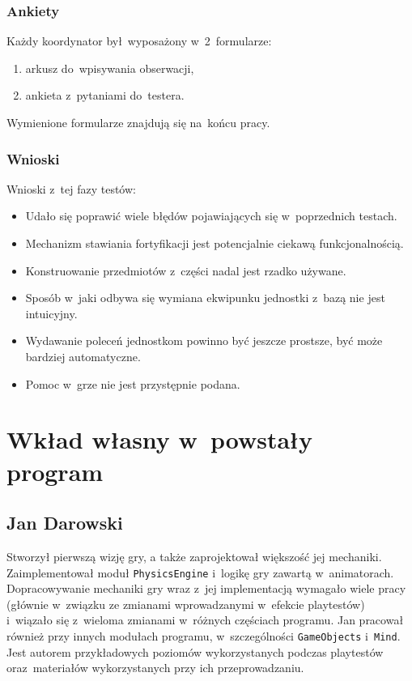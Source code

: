 \documentclass[licencjacka]{pracamgr}
\begin{document}
    \subsection{Ankiety}
      Każdy koordynator był~wyposażony w~2~formularze:
      \begin{enumerate}
	\item arkusz do~wpisywania obserwacji,
	\item ankieta z~pytaniami do~testera.
      \end{enumerate}

      \noindent
      Wymienione formularze znajdują się na~końcu pracy.

    \subsection{Wnioski}
      Wnioski z~tej fazy testów:
      \begin{itemize}
	\item Udało się poprawić wiele błędów pojawiających się w~poprzednich testach.
	\item Mechanizm stawiania fortyfikacji jest potencjalnie ciekawą funkcjonalnością.
	\item Konstruowanie przedmiotów z~części nadal jest rzadko używane.
	\item Sposób w~jaki odbywa się wymiana ekwipunku jednostki z~bazą nie jest intuicyjny.
	\item Wydawanie poleceń jednostkom powinno być jeszcze prostsze, być może bardziej automatyczne.
	\item Pomoc w~grze nie jest przystępnie podana.
      \end{itemize}


\chapter{Wkład własny w~powstały program}

  \section{Jan Darowski}
    Stworzył pierwszą wizję gry, a także zaprojektował większość jej mechaniki. Zaimplementował moduł \texttt{PhysicsEngine}
    i~logikę gry zawartą w~animatorach. Dopracowywanie mechaniki gry wraz z~jej implementacją wymagało wiele pracy (głównie w~związku
    ze zmianami wprowadzanymi w~efekcie playtestów) i~wiązało się z~wieloma zmianami w~różnych częściach programu. 
    Jan pracował również przy innych modułach programu, w~szczególności \texttt{GameObjects} i~\texttt{Mind}. 
    Jest autorem przykładowych poziomów wykorzystanych podczas playtestów oraz~materiałów wykorzystanych przy ich przeprowadzaniu.
\end{document}
